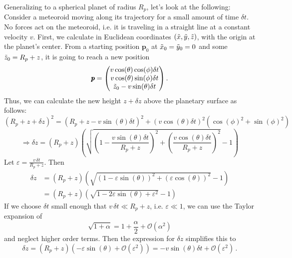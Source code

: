 Generalizing to a spherical planet of radius $R_p$, let's look at the following: Consider a meteoroid moving along its trajectory for a small amount of time $\delta t$. No forces act on the meteoroid, i.e. it is traveling in a straight line at a constant velocity $v$. First, we calculate in Euclidean coordinates $(\Tilde{x}, \Tilde{y}, \Tilde{z})$, with the origin at the planet's center. From a starting position $\pmb{p}_0$ at $\Tilde{x}_0=\Tilde{y}_0=0$ and some $\Tilde{z}_0 = R_p + z$, it is going to reach a new position 
\begin{equation*}
    \pmb{p} = \begin{pmatrix} v\cos(\theta)\cos(\phi)\delta t \\ v\cos(\theta)\sin(\phi) \delta t \\ \Tilde{z}_0 - v\sin(\theta)\delta t\end{pmatrix}.
\end{equation*}
Thus, we can calculate the new height $z + \delta z$ above the planetary surface as follows:
\begin{equation*}
    (R_p + z + \delta z)^2 = \left(R_p + z - v\sin(\theta)\delta t\right)^2 + \left(v\cos(\theta)\delta t\right)^2 \left(\cos(\phi)^2 + \sin(\phi)^2\right)
\end{equation*}
\begin{equation*}
    \Rightarrow \delta z = (R_p + z)\left(\sqrt{\left(1 - \frac{v\sin(\theta)\delta t}{R_p + z}\right)^2 + \left(\frac{v\cos(\theta)\delta t}{R_p + z}\right)^2} - 1 \right)
\end{equation*}
Let $\varepsilon = \frac{v\,\delta t}{R_p + z}$. Then
\begin{align*}
    \delta z &= (R_p + z)\left(\sqrt{\left(1 - \varepsilon\sin(\theta)\right)^2 + \left(\varepsilon\cos(\theta)\right)^2} - 1 \right) \\
    &= (R_p + z)\left(\sqrt{1 - 2\varepsilon\sin(\theta) + \varepsilon^2} - 1 \right)
\end{align*}
If we choose $\delta t$ small enough that $v\,\delta t \ll R_p + z$, i.e. $\varepsilon \ll 1$, we can use the Taylor expansion of
\begin{equation*}
    \sqrt{1 + \alpha} = 1 + \frac{\alpha}{2} + \mathcal{O}(\alpha^2)
\end{equation*}
and neglect higher order terms. Then the expression for $\delta z$ simplifies this to
\begin{equation}
    \delta z = (R_p + z) \left( -\varepsilon\sin(\theta) + \mathcal{O}(\varepsilon^2)\right) = -v\sin(\theta)\delta t + \mathcal{O}(\varepsilon^2)\,.
\end{equation}

